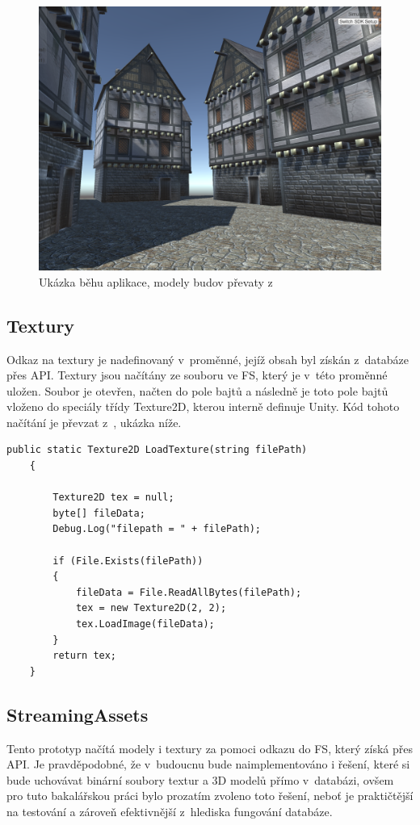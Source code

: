 \documentclass[thesis=B,czech]{FITthesis}[2012/06/26]
\begin{document}
\begin{figure}
  		\includegraphics[width=\textwidth,height=\textheight,keepaspectratio]{screen1.png}
  		\caption{Ukázka běhu aplikace, modely budov převaty z~\cite{building}}
  		\label{fig:buildings}
	\end{figure}
    
    
    \subsection{Textury}
    
    Odkaz na textury je nadefinovaný v~proměnné, jejíž obsah byl získán z~databáze přes API. Textury jsou načítány ze souboru ve FS, který je v~této proměnné uložen. Soubor je otevřen, načten do pole bajtů a následně je toto pole bajtů vloženo do speciály třídy Texture2D, kterou interně definuje Unity. Kód tohoto načítání je převzat z~\cite{unityFAQtext}, ukázka níže.

\begin{lstlisting}[frame=single]
  public static Texture2D LoadTexture(string filePath)
    {

        Texture2D tex = null;
        byte[] fileData;
        Debug.Log("filepath = " + filePath);

        if (File.Exists(filePath))
        {
            fileData = File.ReadAllBytes(filePath);
            tex = new Texture2D(2, 2);
            tex.LoadImage(fileData);
        }
        return tex;
    }
        \end{lstlisting}	
        
        
    \subsection{StreamingAssets}
Tento prototyp načítá modely i textury za pomoci odkazu do FS, který získá přes API. Je pravděpodobné, že v~budoucnu bude naimplementováno i řešení, které si bude uchovávat binární soubory textur a 3D modelů přímo v~databázi, ovšem pro tuto bakalářskou práci bylo prozatím zvoleno toto řešení, neboť je praktičtější na testování a zároveň efektivnější z~hlediska fungování databáze.
\end{document}
